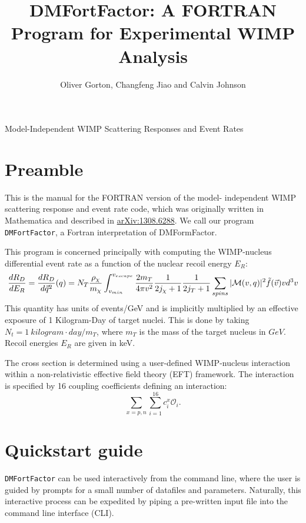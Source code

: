 \documentclass[11pt]{article}
\title{DMFortFactor: A FORTRAN Program for Experimental WIMP Analysis}
\author{Oliver Gorton, Changfeng Jiao and Calvin Johnson}
\begin{document}
\maketitle

{

\centering

Model-Independent WIMP Scattering Responses and Event Rates

}

\tableofcontents


\clearpage

\section{Preamble}

This is the manual for the FORTRAN version of the model- independent WIMP 
scattering response and event rate code, which was originally written in 
Mathematica and described in 
\href{http://arxiv.org/abs/1308.6288v1}{arXiv:1308.6288}.  We call our program
{\tt DMFortFactor}, a Fortran interpretation of DMFormFactor.

This program is concerned principally with computing the WIMP-nucleus differential 
event rate as a function of the nuclear recoil energy $E_R$:
\begin{dmath}
\frac{dR_D}{dE_R} = \frac{dR_D}{d\vec{q}^2}(q)
	\\= N_T\frac{\rho_\chi}{m_\chi}\int_{v_{min}}^{v_{escape}} 
	\frac{2m_T}{4\pi v^2}\frac{1}{2j_\chi+1}\frac{1}{2j_T+1}
	\sum_{spins}|\mathcal{M}(v,q)|^2  \tilde{f}(\vec{v})vd^3v
\end{dmath}
This quantity has units of events/GeV and is implicitly multiplied by
an effective exposure of 1 Kilogram-Day of target nuclei. This is done by
taking $N_t = 1\ kilogram\cdot day / m_T$, where $m_T$ is the mass of the target
nucleus in $GeV$. Recoil energies $E_R$ are given in keV.

The cross section is determined using a user-defined WIMP-nucleus interaction
within a non-relativistic effective field theory (EFT) framework. The
interaction is specified by 16 coupling coefficients defining an interaction:
\begin{equation}
	\sum_{x=p,n}\sum_{i=1}^{16} c_i^x \mathcal{O}_i.
\end{equation}

\section{Quickstart guide}
{\tt DMFortFactor} can be used interactively from the command line,  where the user
is guided by prompts for a small number of datafiles and parameters.  Naturally, this interactive
process can be expedited by piping a pre-written input file into the command line interface (CLI).
\end{document}
